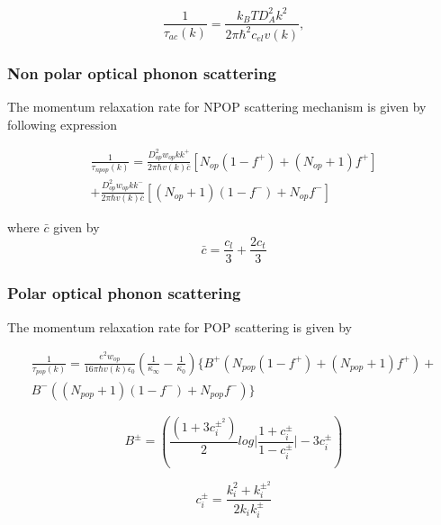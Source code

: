\documentclass[12pt]{article}
\begin{document}
\begin{equation}
\frac{1}{\tau_{ac}(k)} = \frac{k_B T D_A^2 k^2}{2\pi\hbar^2 c_{el}v(k)} ,
\label{acoustic_deformation_p}
\end{equation}

\subsubsection{Non polar optical phonon scattering}
The momentum relaxation rate for NPOP scattering mechanism is given by following expression \cite{ramu2011thermoelectric} 

\begin{multline}
\frac{1}{\tau_{npop}(k)} = \frac{D_{op}^2 w_{op}kk^+}{2\pi \hbar v(k) \bar{c}} \left[ N_{op}(1-f^+) + (N_{op}+1) f^+ \right] \\ + \frac{D_{op}^2 w_{op}kk^-}{2\pi \hbar v(k) \bar{c}} \left[ (N_{op}+1)(1-f^-) + N_{op} f^- \right]
\label{npop_p}
\end{multline}

where $\bar{c}$  given by
\begin{equation}
\bar{c} = \frac{c_l}{3}  + \frac{2 c_t}{3}
\label{c_bar}
\end{equation}  

\subsubsection{Polar optical phonon scattering}
The momentum relaxation rate for POP scattering is given by \cite{ramu2011thermoelectric} 

\begin{multline}
\frac{1}{\tau_{pop}(k)} =  \frac{e^2 w_{op}}{16\pi \hbar v(k) \epsilon_0}  \left( \frac{1}{\kappa_\infty} - \frac{1}{\kappa_0} \right) \{ B^+  \left( N_{pop}(1-f^+) + (N_{pop} +1) f^+ \right) + \\ B^- \left( (N_{pop}+1)(1-f^-) + N_{pop} f^- \right) \}
\label{pop_p}
\end{multline}

\begin{equation}
B^{\pm} = \left( \frac{(1+3c_i^{\pm^2})}{2} log\Bigg| \frac{1+c_i^{\pm}}{1-c_i^{\pm}} \Bigg| - 3c_i^{\pm}\right) 
\label{B_pm}
\end{equation}

\begin{equation}
c_i^{\pm} =  \frac{k_i^2 + k_i^{\pm^2}} {2k_i k_i^{\pm} } 
\label{c_i}
\end{equation}
\end{document}
